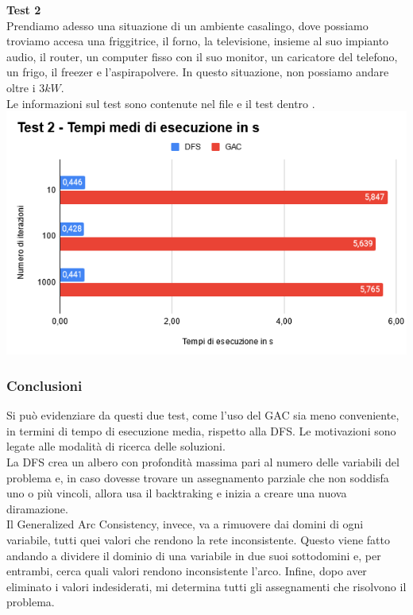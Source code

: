 \documentclass[12pt, letterpaper]{article}
\begin{document}
\noindent \textbf{Test 2} \\

\noindent Prendiamo adesso una situazione di un ambiente casalingo, dove possiamo troviamo accesa una
friggitrice, il forno, la televisione, insieme al suo impianto audio, il router, un computer
fisso con il suo monitor, un caricatore del telefono, un frigo, il freezer e l'aspirapolvere.
In questo situazione, non possiamo andare oltre i $3kW$. \\

\noindent Le informazioni sul test sono contenute nel file  e il test dentro
. \\

\includegraphics[scale=0.8]{test-2-performance.png}


\subsubsection{Conclusioni}

\noindent Si può evidenziare da questi due test, come l'uso del GAC sia meno conveniente, in termini
di tempo di esecuzione media, rispetto alla DFS. Le motivazioni sono legate alle modalità di ricerca delle soluzioni. \\

\noindent La DFS crea un albero con profondità massima pari al numero delle variabili del problema e, in
caso dovesse trovare un assegnamento parziale che non soddisfa uno o più vincoli, allora usa il
backtraking e inizia a creare una nuova diramazione. \\

\noindent Il Generalized Arc Consistency, invece, va a rimuovere dai domini di ogni variabile, tutti quei valori
che rendono la rete inconsistente. Questo viene fatto andando a dividere il dominio di una variabile in due suoi
sottodomini e, per entrambi, cerca quali valori rendono inconsistente l'arco.
Infine, dopo aver eliminato i valori indesiderati, mi determina tutti gli assegnamenti che risolvono il problema.
\end{document}
